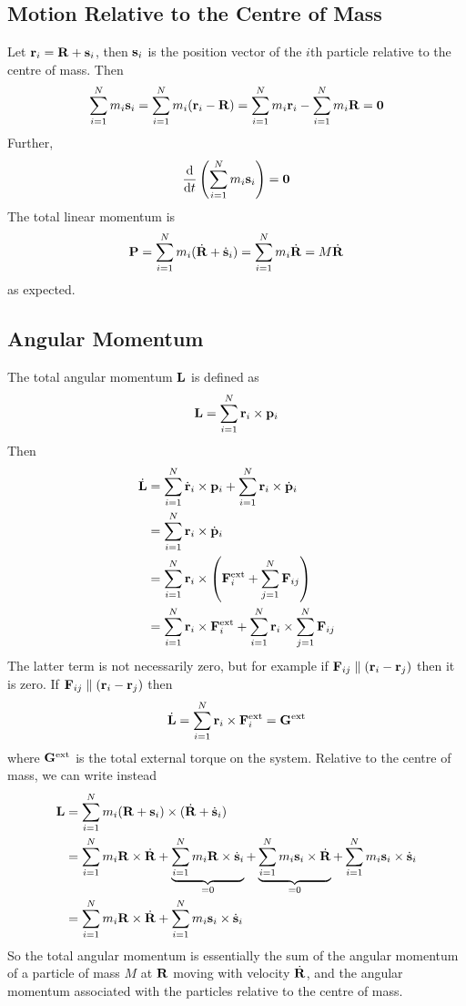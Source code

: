 \subsection{Motion Relative to the Centre of Mass}
Let \(\vb r_i = \vb R + \vb s_i\), then \(\vb s_i\) is the position vector of the \(i\)th particle relative to the centre of mass. Then
\[ \sum_{i=1}^N m_i \vb s_i = \sum_{i=1}^N m_i (\vb r_i - \vb R) = \sum_{i=1}^N m_i \vb r_i - \sum_{i=1}^N m_i \vb R = \vb 0 \]
Further,
\[ \dv{t} \left( \sum_{i=1}^N m_i \vb s_i \right) = \vb 0 \]
The total linear momentum is
\[ \vb P = \sum_{i=1}^N m_i (\dot{\vb R} + \dot{\vb s}_i) = \sum_{i=1}^N m_i \dot{\vb R} = M\dot{\vb R} \]
as expected.

\subsection{Angular Momentum}
The total angular momentum \(\vb L\) is defined as
\[ \vb L = \sum_{i=1}^N \vb r_i \times \vb p_i \]
Then
\begin{align*}
	\dot{\vb L} & = \sum_{i=1}^N \dot{\vb r}_i \times \vb p_i + \sum_{i=1}^N \vb r_i \times \dot{\vb p}_i                \\
	            & = \sum_{i=1}^N \vb r_i \times \dot{\vb p}_i                                                            \\
	            & = \sum_{i=1}^N \vb r_i \times \left( \vb F_i^\text{ext} + \sum_{j=1}^N \vb F_{ij} \right)              \\
	            & = \sum_{i=1}^N \vb r_i \times \vb F_i^\text{ext} + \sum_{i=1}^N \vb r_i \times \sum_{j=1}^N \vb F_{ij} \\
\end{align*}
The latter term is not necessarily zero, but for example if \(\vb F_{ij} \parallel (\vb r_i - \vb r_j)\) then it is zero. If \(\vb F_{ij} \parallel (\vb r_i - \vb r_j)\) then
\[ \dot{\vb L} = \sum_{i=1}^N \vb r_i \times \vb F_i^\text{ext} = \vb G^\text{ext} \]
where \(\vb G^\text{ext}\) is the total external torque on the system. Relative to the centre of mass, we can write instead
\begin{align*}
	\vb L & = \sum_{i=1}^N m_i (\vb R + \vb s_i) \times (\dot{\vb R} + \dot{\vb s}_i)                                                                                                                                                   \\
	      & = \sum_{i=1}^N m_i \vb R \times \dot{\vb R} + \underbrace{\sum_{i=1}^N m_i \vb R \times \dot{\vb s}_i}_{=0} + \underbrace{\sum_{i=1}^N m_i \vb s_i \times \dot{\vb R}}_{=0} + \sum_{i=1}^N m_i \vb s_i \times \dot{\vb s}_i \\
	      & = \sum_{i=1}^N m_i \vb R \times \dot{\vb R} + \sum_{i=1}^N m_i \vb s_i \times \dot{\vb s}_i
\end{align*}
So the total angular momentum is essentially the sum of the angular momentum of a particle of mass \(M\) at \(\vb R\) moving with velocity \(\dot{\vb R}\), and the angular momentum associated with the particles relative to the centre of mass.


